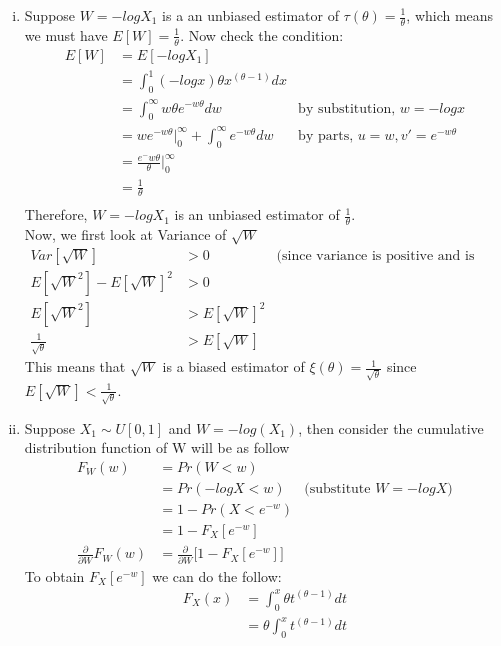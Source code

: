 \documentclass[a4paper,11pt]{article}
\begin{document}
\begin{enumerate}[(a)]
\begin{enumerate}[(i)]
		\item
			Suppose $W= -log X_1$ is a an unbiased estimator of $\tau(\theta) = \frac{1}{\theta}$, which means we must have $E[W] = \frac{1}{\theta}$. Now check the condition:
			\begin{align*}
			E[W] &= E[ -log X_1]\\
			&= \int^1_0 (-logx) \theta x^{(\theta-1)} dx\\
			&= \int^\infty_0 w \theta e^{-w\theta} dw & \mbox{by substitution, $w= -log x$} \\
			&= we^{-w\theta}\bigg|^\infty_0+\int^\infty_0 e^{-w\theta} dw & \mbox{by parts, } u=w, v'=e^{-w\theta}\\
			&=\frac{e^-w\theta}{\theta} \bigg|^\infty_0\\
			&= \frac{1}{\theta}\\
			\end{align*}
			Therefore, $W = -log X_1$ is an unbiased estimator of $\frac{1}{\theta}$.
			\\Now, we first look at Variance of $\sqrt{W}$
			\begin{align*}
				Var[\sqrt{W}]&>0 & \mbox{(since variance is positive and is only equal to zero if its not random)}\\
				E[\sqrt{W}^2] - E[\sqrt{W}]^2&>0\\
				E[\sqrt{W}^2]&>E[\sqrt{W}]^2\\
				\frac{1}{\sqrt{\theta}}&>E[\sqrt{W}]
			\end{align*}			 
			This means that $\sqrt{W}$ is a biased estimator of $\xi(\theta)=\frac{1}{\sqrt{\theta}}$ since $E[\sqrt{W}]<\frac{1}{\sqrt{\theta}}$.
		\item
			Suppose $X_1 \sim U[0,1]$ and $W = -log(X_1)$, then consider the cumulative distribution function of W will be as follow
			\begin{align*}
			F_W(w) &= Pr(W<w)\\
			&= Pr(-logX<w) & \mbox{(substitute $W = -logX$)}\\
			&= 1- Pr(X<e^{-w})\\
			&=1-F_X[e^{-w}]\\
			\frac{\partial}{\partial W} F_W(w)&=\frac{\partial}{\partial W}\bigg[1-F_X[e^{-w}] \bigg] 
			\end{align*}
			To obtain $F_X[e^{-w}]$ we can do the follow:
			\begin{align*}
			F_X(x) & = \int^x_0 \theta t^{(\theta-1)}dt\\
			&= \theta \int^x_0 t^{(\theta-1)}dt\\

\end{align*}
\end{enumerate}
\end{enumerate}
\end{document}
